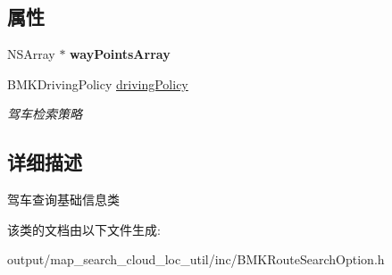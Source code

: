 \subsection*{属性}
\begin{DoxyCompactItemize}
\item 
\hypertarget{interface_b_m_k_driving_route_plan_option_a13b365a390f0ccfc2f2b5d16927eb9db}{N\+S\+Array $\ast$ {\bfseries way\+Points\+Array}}\label{interface_b_m_k_driving_route_plan_option_a13b365a390f0ccfc2f2b5d16927eb9db}

\item 
\hypertarget{interface_b_m_k_driving_route_plan_option_a51fe8957c72c8d0d478515bd7afa0cfd}{B\+M\+K\+Driving\+Policy \hyperlink{interface_b_m_k_driving_route_plan_option_a51fe8957c72c8d0d478515bd7afa0cfd}{driving\+Policy}}\label{interface_b_m_k_driving_route_plan_option_a51fe8957c72c8d0d478515bd7afa0cfd}

\begin{DoxyCompactList}\small\item\em 驾车检索策略 \end{DoxyCompactList}\end{DoxyCompactItemize}


\subsection{详细描述}
驾车查询基础信息类 

该类的文档由以下文件生成\+:\begin{DoxyCompactItemize}
\item 
output/map\+\_\+search\+\_\+cloud\+\_\+loc\+\_\+util/inc/B\+M\+K\+Route\+Search\+Option.\+h\end{DoxyCompactItemize}
